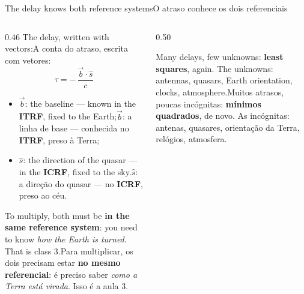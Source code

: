 \documentclass[aspectratio=169,11pt]{beamer}
\newcommand{\tr}[2]{\ifEN#2\else#1\fi}
\newcommand{\bnum}[1]{\textbf{\textcolor{mTeal}{#1}}}
\newcommand{\fram}[1]{\textcolor{corFrame}{\textbf{#1}}}
\begin{document}
\begin{frame}{\tr{O atraso conhece os dois referenciais}{The delay knows both reference systems}}
  \begin{columns}[T]
    \begin{column}{0.46\textwidth}
      \small
      \tr{A conta do atraso, escrita com vetores:}{The delay, written with vectors:}
      \[ \tau = -\,\frac{\vec{b}\cdot\hat{s}}{c} \]
      \begin{itemize}
        \setlength{\itemsep}{2pt}
        \item \tr{$\vec b$: a linha de base --- conhecida no \fram{ITRF}, preso à Terra;}{$\vec b$: the baseline --- known in the \fram{ITRF}, fixed to the Earth;}
        \item \tr{$\hat s$: a direção do quasar --- no \fram{ICRF}, preso ao céu.}{$\hat s$: the direction of the quasar --- in the \fram{ICRF}, fixed to the sky.}
      \end{itemize}
      \smallskip
      \tr{Para multiplicar, os dois precisam estar \bnum{no mesmo referencial}: é preciso saber
      \emph{como a Terra está virada}. Isso é a aula 3.}{To multiply, both must be \bnum{in the
      same reference system}: you need to know \emph{how the Earth is turned}. That is class
      3.}
    \end{column}
    \begin{column}{0.50\textwidth}
      \centering
      \bigskip

      \tr{Muitos atrasos, poucas incógnitas: \bnum{mínimos quadrados}, de novo. As incógnitas: antenas, quasares, orientação da Terra, relógios, atmosfera.}{Many delays, few unknowns: \bnum{least squares}, again. The unknowns: antennas, quasars, Earth orientation, clocks, atmosphere.}
    \end{column}
  \end{columns}
\end{frame}
\end{document}
